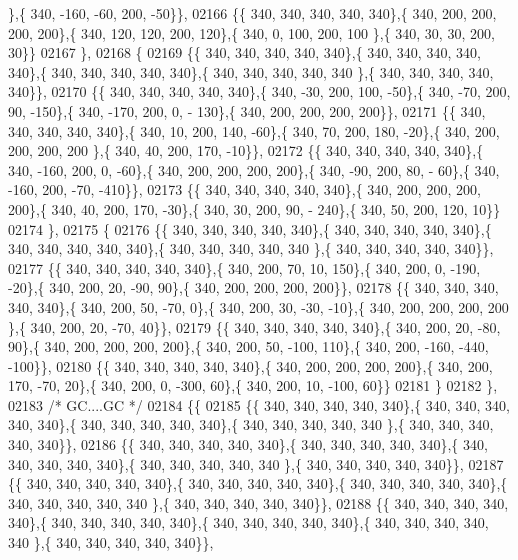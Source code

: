 \begin{DoxyCode}
      \},\{ 340, -160, -60, 200, -50\}\},
02166 \{\{ 340, 340, 340, 340, 340\},\{ 340, 200, 200, 200, 200\},\{ 340, 120, 120, 200, 120\},\{ 340,   0, 100, 200, 100
      \},\{ 340,  30,  30, 200,  30\}\}
02167 \},
02168 \{
02169 \{\{ 340, 340, 340, 340, 340\},\{ 340, 340, 340, 340, 340\},\{ 340, 340, 340, 340, 340\},\{ 340, 340, 340, 340, 340
      \},\{ 340, 340, 340, 340, 340\}\},
02170 \{\{ 340, 340, 340, 340, 340\},\{ 340, -30, 200, 100, -50\},\{ 340, -70, 200,  90, -150\},\{ 340, -170, 200,   0, -
      130\},\{ 340, 200, 200, 200, 200\}\},
02171 \{\{ 340, 340, 340, 340, 340\},\{ 340,  10, 200, 140, -60\},\{ 340,  70, 200, 180, -20\},\{ 340, 200, 200, 200, 200
      \},\{ 340,  40, 200, 170, -10\}\},
02172 \{\{ 340, 340, 340, 340, 340\},\{ 340, -160, 200,   0, -60\},\{ 340, 200, 200, 200, 200\},\{ 340, -90, 200,  80, -
      60\},\{ 340, -160, 200, -70, -410\}\},
02173 \{\{ 340, 340, 340, 340, 340\},\{ 340, 200, 200, 200, 200\},\{ 340,  40, 200, 170, -30\},\{ 340,  30, 200,  90, -
      240\},\{ 340,  50, 200, 120,  10\}\}
02174 \},
02175 \{
02176 \{\{ 340, 340, 340, 340, 340\},\{ 340, 340, 340, 340, 340\},\{ 340, 340, 340, 340, 340\},\{ 340, 340, 340, 340, 340
      \},\{ 340, 340, 340, 340, 340\}\},
02177 \{\{ 340, 340, 340, 340, 340\},\{ 340, 200,  70,  10, 150\},\{ 340, 200,   0, -190, -20\},\{ 340, 200,  20, -90,  
      90\},\{ 340, 200, 200, 200, 200\}\},
02178 \{\{ 340, 340, 340, 340, 340\},\{ 340, 200,  50, -70,   0\},\{ 340, 200,  30, -30, -10\},\{ 340, 200, 200, 200, 200
      \},\{ 340, 200,  20, -70,  40\}\},
02179 \{\{ 340, 340, 340, 340, 340\},\{ 340, 200,  20, -80,  90\},\{ 340, 200, 200, 200, 200\},\{ 340, 200,  50, -100, 
      110\},\{ 340, 200, -160, -440, -100\}\},
02180 \{\{ 340, 340, 340, 340, 340\},\{ 340, 200, 200, 200, 200\},\{ 340, 200, 170, -70,  20\},\{ 340, 200,   0, -300,  
      60\},\{ 340, 200,  10, -100,  60\}\}
02181 \}
02182 \},
02183 \textcolor{comment}{/* GC....GC */}
02184 \{\{
02185 \{\{ 340, 340, 340, 340, 340\},\{ 340, 340, 340, 340, 340\},\{ 340, 340, 340, 340, 340\},\{ 340, 340, 340, 340, 340
      \},\{ 340, 340, 340, 340, 340\}\},
02186 \{\{ 340, 340, 340, 340, 340\},\{ 340, 340, 340, 340, 340\},\{ 340, 340, 340, 340, 340\},\{ 340, 340, 340, 340, 340
      \},\{ 340, 340, 340, 340, 340\}\},
02187 \{\{ 340, 340, 340, 340, 340\},\{ 340, 340, 340, 340, 340\},\{ 340, 340, 340, 340, 340\},\{ 340, 340, 340, 340, 340
      \},\{ 340, 340, 340, 340, 340\}\},
02188 \{\{ 340, 340, 340, 340, 340\},\{ 340, 340, 340, 340, 340\},\{ 340, 340, 340, 340, 340\},\{ 340, 340, 340, 340, 340
      \},\{ 340, 340, 340, 340, 340\}\},

\end{DoxyCode}
